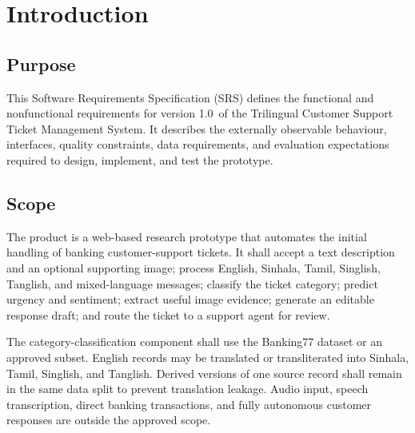 \documentclass[10pt,letterpaper]{article}
\newcommand{\projectname}{Trilingual Customer Support Ticket Management System}
\newcommand{\documentversion}{1.0}
\newenvironment{templatebody}{\par\justifying\setlength{\emergencystretch}{3em}}{\par}
\begin{document}
\begin{templatebody}
\section{Introduction}

\subsection{Purpose}
This Software Requirements Specification (SRS) defines the functional and nonfunctional requirements for version \documentversion\ of the \projectname. It describes the externally observable behaviour, interfaces, quality constraints, data requirements, and evaluation expectations required to design, implement, and test the prototype.

\subsection{Scope}
The product is a web-based research prototype that automates the initial handling of banking customer-support tickets. It shall accept a text description and an optional supporting image; process English, Sinhala, Tamil, Singlish, Tanglish, and mixed-language messages; classify the ticket category; predict urgency and sentiment; extract useful image evidence; generate an editable response draft; and route the ticket to a support agent for review.

The category-classification component shall use the Banking77 dataset or an approved subset. English records may be translated or transliterated into Sinhala, Tamil, Singlish, and Tanglish. Derived versions of one source record shall remain in the same data split to prevent translation leakage. Audio input, speech transcription, direct banking transactions, and fully autonomous customer responses are outside the approved scope.


\end{templatebody}
\end{document}
